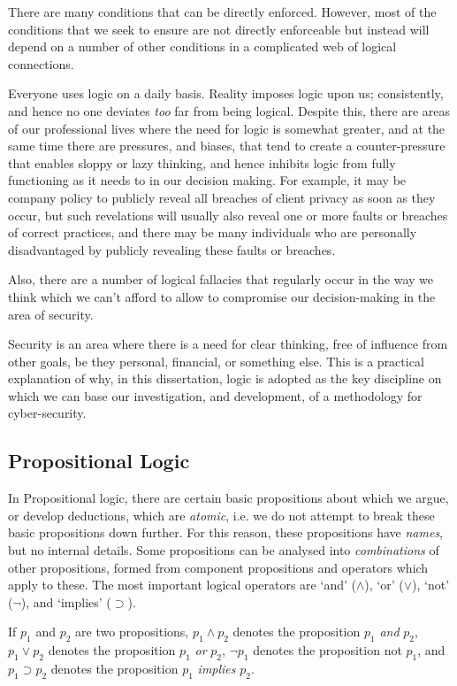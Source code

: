 There are many conditions that can be directly enforced. However, most of the conditions that we seek to ensure are not directly enforceable but instead will depend on a number of other conditions in a complicated web of logical connections.

Everyone uses logic on a daily basis. Reality imposes logic upon us; consistently, and hence no one deviates {\em too} far from being logical. Despite this, there are areas of our professional lives where the need for logic is somewhat greater, and at the same time there are pressures, and biases, that tend to create a counter-pressure that enables sloppy or lazy thinking, and hence inhibits logic from fully functioning as it needs to in our decision making. For example, it may be company policy to publicly reveal all breaches of client privacy as soon as they occur, but such revelations will usually also reveal one or more faults or breaches of correct practices, and there may be many individuals who are personally disadvantaged by publicly revealing these faults or breaches.

Also, there are a number of logical fallacies that regularly occur in the way we think which we can't afford to allow to compromise our decision-making in the area of security.

Security is an area where there is a need for clear thinking, free of influence from other goals, be they personal, financial, or something else. This is a practical explanation of why, in this dissertation, logic is adopted as the key discipline on which we can base our investigation, and development, of a methodology for cyber-security.

\subsection{Propositional Logic}

In Propositional logic, there are certain basic propositions about which we argue, or develop deductions, 
which are {\em atomic}, i.e. we do not attempt to break these basic propositions down further. For this reason,
these propositions have {\em names}, but no internal details. Some propositions can be analysed into {\em combinations}
of other propositions, formed from component propositions and operators which apply to these. The most important
logical operators are `and' ($\wedge$), `or' ($\vee$), `not' ($\neg$), and `implies' ($\supset$).

If $p_1$ and $p_2$ are two propositions, $p_1\wedge p_2$ denotes the proposition $p_1$ {\em and} $p_2$,
$p_1 \vee p_2$ denotes the proposition $p_1$ {\em or} $p_2$, 
$\neg p_1$ denotes the proposition not $p_1$, and $p_1 \supset p_2$ denotes
the proposition $p_1$ {\em implies} $p_2$.


